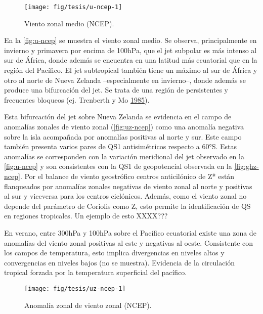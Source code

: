 \documentclass[spanish,a4paper,12p]{book}
\begin{document}
\begin{landscape}\begin{figure}

{\centering \texttt{[image: fig/tesis/u-ncep-1]} 

}

\caption{Viento zonal medio (NCEP).}\label{fig:u-ncep}
\end{figure}
\end{landscape}

En la \autoref{fig:u-ncep} se muestra el viento zonal medio. Se observa,
principalmente en invierno y primavera por encima de 100hPa, que el jet
subpolar es más intenso al sur de África, donde además se encuentra en
una latitud más ecuatorial que en la región del Pacífico. El jet
subtropical también tiene un máximo al sur de África y otro al norte de
Nueva Zelanda --especialmente en invierno--, donde además se produce una
bifurcación del jet. Se trata de una región de persistentes y frecuentes
bloqueos (ej. Trenberth y Mo
\protect\hyperlink{ref-Trenberth1985}{1985}).

Esta bifurcación del jet sobre Nueva Zelanda se evidencia en el campo de
anomalías zonales de viento zonal (\autoref{fig:uz-ncep}) como una
anomalía negativa sobre la isla acompañada por anomalías positivas al
norte y sur. Este campo también presenta varios pares de QS1
antisimétricos respecto a 60°S. Estas anomalías se corresponden con la
variación meridional del jet observado en la \autoref{fig:u-ncep} y son
consistentes con la QS1 de geopotencial observada en la
\autoref{fig:ghz-ncep}. Por el balance de viento geostrófico centros
anticilónico de Z* están flanqueados por anomalías zonales negativas de
viento zonal al norte y positivas al sur y viceversa para los centros
ciclónicos. Además, como el viento zonal no depende del parámetro de
Coriolis como Z, esto permite la identificación de QS en regiones
tropicales. Un ejemplo de esto XXXX???

En verano, entre 300hPa y 100hPa sobre el Pacífico ecuatorial existe una
zona de anomalías del viento zonal positivas al este y negativas al
oeste. Consistente con los campos de temperatura, esto implica
divergencias en niveles altos y convergencias en niveles bajos (no se
muestra). Evidencia de la circulación tropical forzada por la
temperatura superficial del pacífico.

\begin{landscape}\begin{figure}

{\centering \texttt{[image: fig/tesis/uz-ncep-1]} 

}

\caption{Anomalía zonal de viento zonal (NCEP).}\label{fig:uz-ncep}
\end{figure}
\end{landscape}
\end{document}
